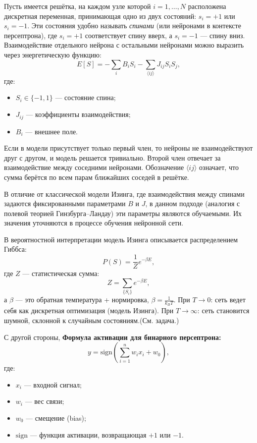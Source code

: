 \begin{description}
	      Пусть имеется решётка, на каждом узле которой $i = 1, \dots, N$ расположена дискретная переменная, принимающая одно из двух состояний: $s_i = +1$ или $s_i = -1$. Эти состояния удобно называть \textit{спинами} (или нейронами в контексте персептрона), где $s_i = +1$ соответствует спину вверх, а $s_i = -1$ — спину вниз.
	      Взаимодействие отдельного нейрона с остальными нейронами можно выразить через энергетическую функцию:
	      \[
		      E[S] = - \sum_i B_i S_i -\sum_{\langle i j \rangle} J_{ij} S_i S_j,
	      \]
	      где:
	      \begin{itemize}
		      \item $S_i \in \{-1, 1\}$ — состояние спина;
		      \item $J_{ij}$ — коэффициенты взаимодействия;
		      \item $B_i$ — внешнее поле.
	      \end{itemize}
	      Если в модели присутствует только первый член, то нейроны не взаимодействуют друг с другом, и модель решается тривиально. Второй член отвечает за взаимодействие между соседними нейронами. Обозначение $\langle i j \rangle$ означает, что сумма берётся по всем парам ближайших соседей в решётке.

	      В отличие от классической модели Изинга, где взаимодействия между спинами задаются фиксированными параметрами $B$ и $J$, в данном подходе (аналогия с полевой теорией Гинзбурга–Ландау) эти параметры являются обучаемыми. Их значения уточняются в процессе обучения нейронной сети.

	      В вероятностной интерпретации модель Изинга описывается распределением Гиббса:
	      \[
		      P(S) = \frac{1}{Z} e^{-\beta E},
	      \]
	      где $Z$ — статистическая сумма:
	      \[
		      Z = \sum_{\{S_i\}} e^{-\beta E},
	      \]
	      а $\beta$ — это обратная температура
	      + нормировка, $\beta = \frac{1}{k_B T}$. При
	      $T\rightarrow0$: сеть ведет себя как дискретная оптимизация (модель Изинга).
	      При $T \rightarrow \infty$: сеть становится шумной, склонной к случайным состояниям.(См. задача.)

	      С другой стороны, \textbf{Формула активации для бинарного персептрона:}
	      \[
		      y = \mathrm{sign}\left(\sum_{i=1}^n w_i x_i + w_0\right),
	      \]
	      где:
	      \begin{itemize}
		      \item $x_i$ — входной сигнал;
		      \item $w_i$ — вес связи;
		      \item $w_0$ — смещение (bias);
		      \item $\mathrm{sign}$ — функция активации, возвращающая $+1$ или $-1$.
	      \end{itemize}


\end{description}
